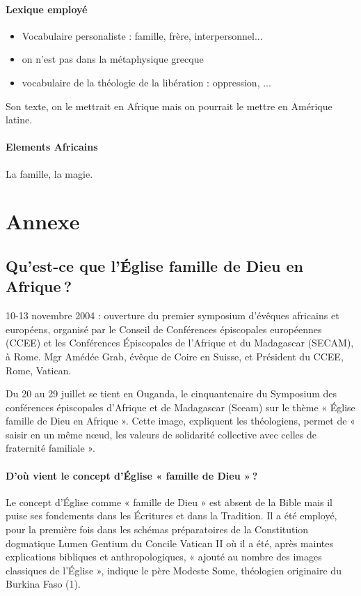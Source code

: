 \paragraph{Lexique employé} 
\begin{itemize}
    \item Vocabulaire personaliste : famille, frère, interpersonnel...
    \item on n'est pas dans la métaphysique grecque
    \item vocabulaire de la théologie de la libération : oppression, ...
\end{itemize}
Son texte, on le mettrait en Afrique mais on pourrait le mettre en Amérique latine. 

\paragraph{Elements Africains} La famille, la magie. 


\section{Annexe}

\subsection{Qu’est-ce que l’Église famille de Dieu en Afrique ?}


10-13 novembre 2004 : ouverture du premier symposium d'évêques africains et européens, organisé par le Conseil de Conférences épiscopales européennes (CCEE) et les Conférences Épiscopales de l'Afrique et du Madagascar (SECAM), à Rome. Mgr Amédée Grab, évêque de Coire en Suisse, et Président du CCEE, Rome, Vatican.

Du 20 au 29 juillet se tient en Ouganda, le cinquantenaire du Symposium des conférences épiscopales d’Afrique et de Madagascar (Sceam) sur le thème « Église famille de Dieu en Afrique ».
Cette image, expliquent les théologiens, permet de « saisir en un même nœud, les valeurs de solidarité collective avec celles de fraternité familiale ».

\paragraph{D’où vient le concept d’Église « famille de Dieu » ?} 
Le concept d’Église comme « famille de Dieu » est absent de la Bible mais il puise ses fondements dans les Écritures et dans la Tradition. Il a été employé, pour la première fois dans les schémas préparatoires de la Constitution dogmatique Lumen Gentium du Concile Vatican II où il a été, après maintes explications bibliques et anthropologiques, « ajouté au nombre des images classiques de l’Église », indique le père Modeste Some, théologien originaire du Burkina Faso (1).

